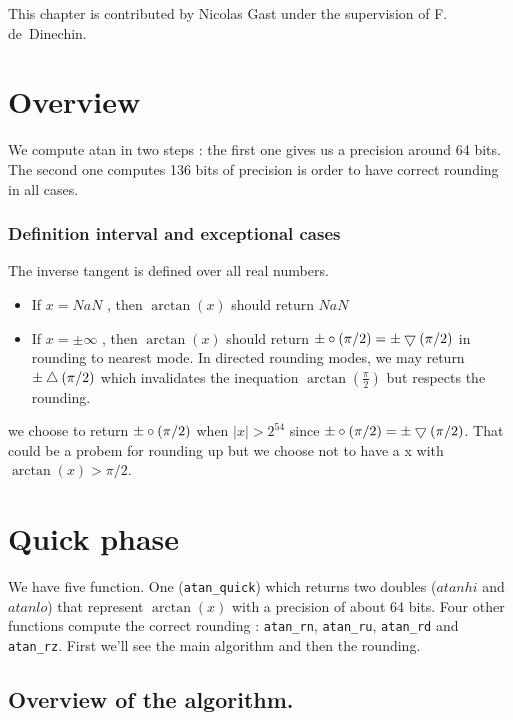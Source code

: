 This chapter is contributed by Nicolas Gast under the supervision of
F. de~Dinechin.  

\newcommand{\xred}{X_{\mathrm{red}}}
\newcommand{\xredhi}{X_{\mathrm{red hi}}}
\newcommand{\xredlo}{X_{\mathrm{red lo}}}

\section{Overview}

We compute atan in two steps : the first one gives us a precision around 64
bits. The second one computes 136 bits of precision is order to have
correct rounding in all cases.

\subsubsection{Definition interval and exceptional cases}

The inverse tangent is defined over all real numbers.

\begin{itemize}
\item If $x = NaN$ , then $\arctan(x)$ should return $NaN$
\item If $x = \pm\infty$ , then $\arctan(x)$ should return
$\pm\circ(\pi/2) = \pm\bigtriangledown(\pi/2)$ in rounding to nearest mode. In
directed rounding modes, we may return $\pm\bigtriangleup(\pi/2)$ which
invalidates the inequation $\arctan(\frac{\pi}{2})$ but respects the
rounding.
\end{itemize}
we choose to return $\pm\circ(\pi/2)$ when $|x|>2^{54}$ since
$\pm\circ(\pi/2) =\pm\bigtriangledown(\pi/2) $. That could be a probem for
rounding up but we choose not to have a x with $\arctan(x) > \pi/2$.
\section{Quick phase}

We have five function. One (\texttt{atan\_quick}) which returns two doubles
($atanhi$ and $atanlo$) that represent $\arctan(x)$ with a precision of
about 64 bits. Four other functions compute the correct rounding :
\texttt{atan\_rn}, \texttt{atan\_ru}, \texttt{atan\_rd} and
\texttt{atan\_rz}. First we'll see the main algorithm and then the rounding.

\subsection{Overview of the algorithm.}

